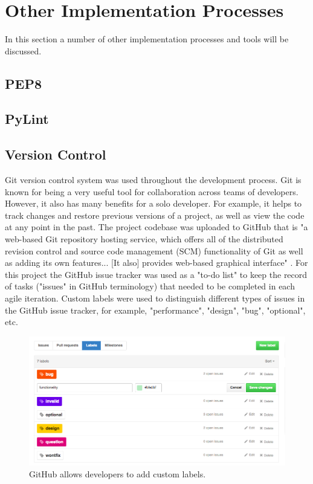 \section{Other Implementation Processes}
\label{sec:otherprocesses}
In this section a number of other implementation processes and tools will be discussed.

\subsection{PEP8}
\subsection{PyLint}

\subsection{Version Control}
\label{subsec:git}
Git version control system was used throughout the development process. Git is known for being a very useful tool for collaboration across teams of developers. However, it also has many benefits for a solo developer. For example, it helps to track changes and restore previous versions of a project, as well as view the code at any point in the past. The project codebase was uploaded to GitHub that is "a web-based Git repository hosting service, which offers all of the distributed revision control and source code management (SCM) functionality of Git as well as adding its own features... [It also] provides web-based graphical interface" \citep{wiki:GitHub}. For this project the GitHub issue tracker was used as a "to-do list" to keep the record of tasks ("issues" in GitHub terminology) that needed to be completed in each agile iteration. Custom labels were used to distinguish different types of issues in the GitHub issue tracker, for example, "performance", "design", "bug", "optional", etc.

\begin{figure}[H]
	\begin{center}
		\includegraphics[width=.90\textwidth]{impl/images/githubLabelsChoice}
		\caption{GitHub allows developers to add custom labels.} \label{fig:using:githublabelschoice}
	\end{center}
\end{figure}


